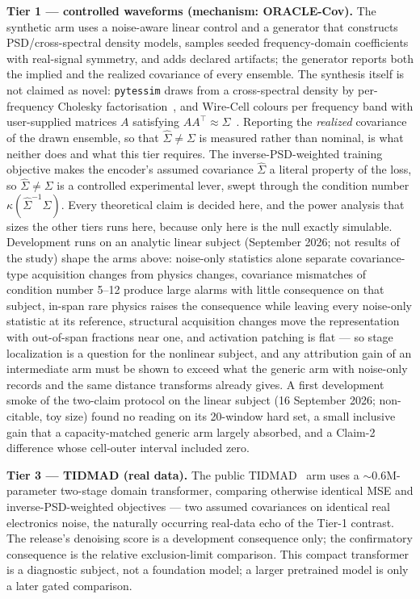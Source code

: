 \documentclass[10pt,twocolumn]{extarticle}
\begin{document}
\textbf{Tier 1 --- controlled waveforms (mechanism: ORACLE-Cov).} The
synthetic arm uses a noise-aware linear control and a generator that
constructs PSD/cross-spectral density models, samples seeded frequency-domain
coefficients with real-signal symmetry, and adds declared artifacts; the
generator reports both the implied and the realized covariance of every
ensemble. The synthesis itself is not claimed as novel: \texttt{pytessim} draws
from a cross-spectral density by per-frequency Cholesky
factorisation~\cite{pytessim}, and Wire-Cell colours per frequency band with
user-supplied matrices $A$ satisfying $AA^{\top}\approx\Sigma$~\cite{wirecell}.
Reporting the \emph{realized} covariance of the drawn ensemble, so that
$\hat\Sigma\neq\Sigma$ is measured rather than nominal, is what neither does and
what this tier requires. The inverse-PSD-weighted training objective makes the encoder's
assumed covariance $\hat\Sigma$ a literal property of the loss, so
$\hat\Sigma\neq\Sigma$ is a controlled experimental lever, swept through
the condition number $\kappa(\hat\Sigma^{-1}\Sigma)$. Every theoretical
claim is decided here, and the power analysis that sizes the other tiers runs
here, because only here is the null exactly simulable. Development runs on an
analytic linear subject (September 2026; not results of the study) shape the
arms above: noise-only statistics alone separate covariance-type acquisition
changes from physics changes, covariance mismatches of condition number
5--12 produce large alarms with little consequence on that subject, in-span
rare physics raises the consequence while leaving every noise-only statistic at
its reference, structural acquisition changes move the representation with
out-of-span fractions near one, and activation patching is flat --- so stage
localization is a question for the nonlinear subject, and any attribution
gain of an intermediate arm must be shown to exceed what the generic arm with
noise-only records and the same distance transforms already gives. A first
development smoke of the two-claim protocol on the linear subject (16
September 2026; non-citable, toy size) found no reading on its 20-window hard
set, a small inclusive gain that a capacity-matched generic arm largely
absorbed, and a Claim-2 difference whose cell-outer interval included zero.

\textbf{Tier 3 --- TIDMAD (real data).} The public TIDMAD~\cite{tidmad} arm
uses a $\sim0.6$M-parameter two-stage domain transformer, comparing otherwise
identical MSE and inverse-PSD-weighted objectives --- two assumed covariances
on identical real electronics noise, the naturally occurring real-data echo of
the Tier-1 contrast. The release's denoising score is a development
consequence only; the confirmatory consequence is the relative
exclusion-limit comparison. This compact transformer is a diagnostic subject,
not a foundation model; a larger pretrained model is only a later gated
comparison.
\end{document}
